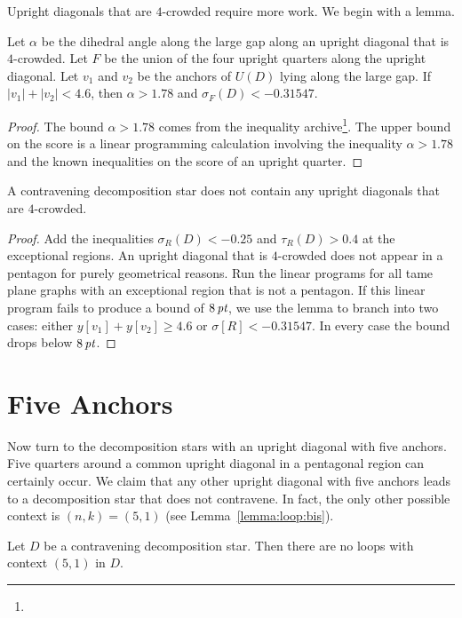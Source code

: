 Upright diagonals that are $4$-crowded require more work.  We
begin with a lemma.

\begin{lemma}
Let $\alpha$ be the dihedral angle along the large gap along an
upright diagonal that is $4$-crowded. Let $F$ be the union of the
four upright quarters along the upright diagonal.  Let $v_1$ and
$v_2$ be the anchors of $U(D)$ lying along the large gap.  If
$|v_1|+|v_2| < 4.6$, then $\alpha
>1.78$ and $\sigma_F(D) < -0.31547$.
\end{lemma}

\begin{proof}
The bound $\alpha>1.78$ comes from the inequality
archive\footnote{}. The upper bound on the score
is a linear programming calculation involving the inequality
$\alpha > 1.78$ and the known inequalities on the score of an
upright quarter.
\end{proof}

\begin{lemma}
A contravening decomposition star does not contain any upright
diagonals that are $4$-crowded.
\end{lemma}

\begin{proof}
Add the inequalities $\sigma_R(D) <-0.25$ and $\tau_R(D) >0.4$ at
the exceptional regions. An upright diagonal that is $4$-crowded
does not appear in a pentagon for purely geometrical reasons. Run
the linear programs for all tame plane graphs with an exceptional
region that is not a pentagon. If this linear program fails to
produce a bound of $8\,\hbox{\it pt}$, we use the lemma to branch into two
cases: either $y[v_1]+y[v_2]\ge4.6$ or $\sigma[R]<-0.31547$. In
every case the bound drops below $8\,\hbox{\it pt}$.
\end{proof}

\section{Five Anchors}

Now turn to the decomposition stars with an upright diagonal with
five anchors. Five quarters around a common upright diagonal in a
pentagonal region can certainly occur.  We claim that any other
upright diagonal with five anchors leads to a decomposition star
that does not contravene.  In fact, the only other possible
context is $(n,k)=(5,1)$ (see Lemma~\ref{lemma:loop:bis}).



\begin{lemma} Let $D$ be a contravening decomposition star.  Then there
are no loops with context $(5,1)$ in $D$.
\end{lemma}

